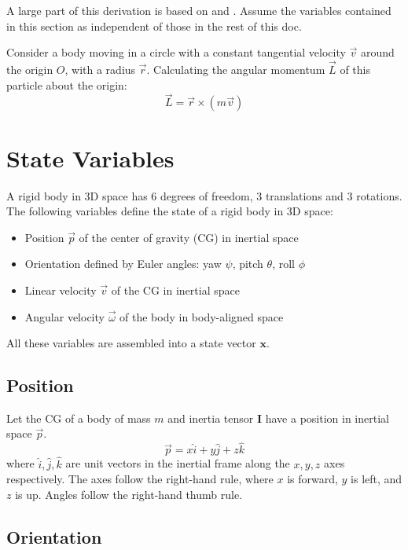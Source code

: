 \documentclass[a4paper,12pt]{article}
\begin{document}
A large part of this derivation is based on \cite{blackedout01} and \cite{gmu_mech}. Assume the variables contained in this section as independent of those in the rest of this doc.

Consider a body moving in a circle with a constant tangential velocity \(\vec{v}\) around the origin \(O\), with a radius \(\vec{r}\). Calculating the angular momentum \(\vec{L}\) of this particle about the origin:
\begin{equation} \nonumber
    \vec{L} = \vec{r} \times (m \vec{v})
\end{equation}





\section{State Variables}
A rigid body in 3D space has 6 degrees of freedom, 3 translations and 3 rotations. The following variables define the state of a rigid body in 3D space:
\begin{itemize}
    \item Position \( \vec{p} \) of the center of gravity (CG) in inertial space
    \item Orientation defined by Euler angles: yaw \( \psi \), pitch \( \theta \), roll \( \phi \)
    \item Linear velocity \( \vec{v} \) of the CG in inertial space
    \item Angular velocity \( \vec{\omega} \) of the body in body-aligned space
\end{itemize}
All these variables are assembled into a state vector \( \mathbf{x} \).

\subsection{Position}
Let the CG of a body of mass \( m \) and inertia tensor \( \mathbf{I} \) have a position in inertial space \(\vec{p}\).
\begin{equation}
    \vec{p} = x \hat{i} + y \hat{j} + z \hat{k}
\end{equation}
where \( \hat{i}, \hat{j}, \hat{k} \) are unit vectors in the inertial frame along the \( x, y, z \) axes respectively. The axes follow the right-hand rule, where \( x \) is forward, \( y \) is left, and \( z \) is up. Angles follow the right-hand thumb rule.


\subsection{Orientation}
\end{document}
